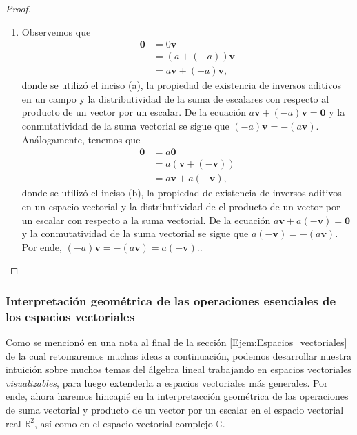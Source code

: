 \documentclass[apuntes]{subfiles}
\begin{document}
\begin{proof}
\begin{enumerate}[label=(\alph*)]
        \item Observemos que
            \begin{align*}
                \mathbf{0} &= 0\mathbf{v} \\
                           &= (a+(-a)) \mathbf{v} \\
                           &= a\mathbf{v} + (-a)\mathbf{v},
            \end{align*}
            donde se utilizó el inciso (a), la propiedad de existencia de inversos aditivos en un campo y la distributividad de la suma de escalares con respecto al producto de un vector por un escalar. De la ecuación $a\mathbf{v} + (-a)\mathbf{v} = \mathbf{0}$ y la conmutatividad de la suma vectorial se sigue que $(-a)\mathbf{v} = -(a\mathbf{v})$. Análogamente, tenemos que
            \begin{align*}
                \mathbf{0} &= a\mathbf{0} \\
                           &= a(\mathbf{v} + (-\mathbf{v})) \\
                           &= a\mathbf{v} + a(-\mathbf{v}),
            \end{align*}
            donde se utilizó el inciso (b), la propiedad de existencia de inversos aditivos en un espacio vectorial y la distributividad de el producto de un vector por un escalar con respecto a la suma vectorial. De la ecuación $a\mathbf{v}+a(-\mathbf{v}) = \mathbf{0}$ y la conmutatividad de la suma vectorial se sigue que $a(-\mathbf{v}) = -(a\mathbf{v})$. Por ende, $(-a)\mathbf{v} = -(a\mathbf{v}) = a(-\mathbf{v})$..

    \end{enumerate}
\end{proof}

\subsubsection*{Interpretación geométrica de las operaciones esenciales de los espacios vectoriales} \label{Sssec:Interpretación geométrica de las operaciones de los espacios vectoriales}

Como se mencionó en una nota al final de la sección \ref{Ejem:Espacios_vectoriales} \hspace{1.5mm}\textemdash de la cual retomaremos muchas ideas a continuación\textemdash, podemos desarrollar nuestra intuición sobre muchos temas del álgebra lineal trabajando en espacios vectoriales \emph{visualizables}, para luego extenderla a espacios vectoriales más generales. Por ende, ahora haremos hincapié en la interpretacción geométrica de las operaciones de suma vectorial y producto de un vector por un escalar en el espacio vectorial real $\mathbb{R}^2$, así como en el espacio vectorial complejo $\mathbb{C}$.
\end{document}
